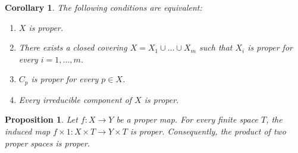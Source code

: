 \documentclass[amssymb,amscd,11pt,20pt]{amsart}
\newcommand{\0}{\mathbf 0}
\theoremstyle{plain}
\newtheorem{cor}[thm]{Corollary}
\newtheorem{prop}[thm]{Proposition}
\numberwithin{equation}{thm}
\begin{document}
\begin{cor} The following conditions are equivalent:
\begin{enumerate} \item $X$ is proper.
\item There exists a closed covering $X=X_1\cup\dots \cup X_m$ such that $ X_i$ is proper for every $i=1,\dots ,m$.
\item $ C_p$ is proper for every $p\in X$.
\item Every irreducible component of $X$ is proper.
\end{enumerate}
\end{cor}

\begin{prop}\label{basechange0} Let $f\colon X\to Y$ be a proper map. For every finite space $T$, the induced map  $f\times1\colon X\times T  \to   Y\times T $ is proper. Consequently, the product of two proper spaces is proper.
\end{prop}
\end{document}
